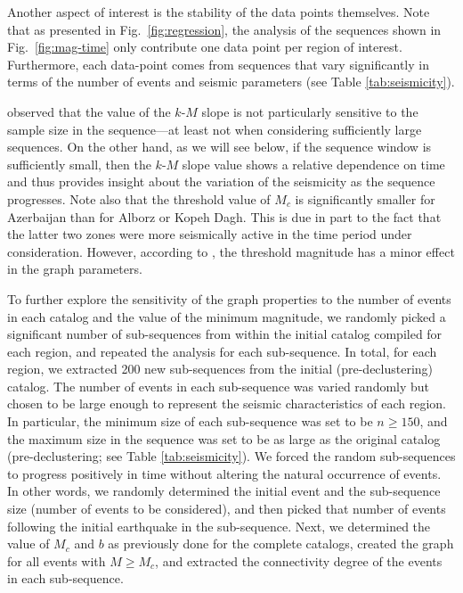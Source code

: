 Another aspect of interest is the stability of the data points themselves. Note that as presented in Fig.~\ref{fig:regression}, the analysis of the sequences shown in Fig.~\ref{fig:mag-time} only contribute one data point per region of interest. Furthermore, each data-point comes from sequences that vary significantly in terms of the number of events and seismic parameters (see Table \ref{tab:seismicity}). 

\citet{Telesca2013} observed that the value of the $k$-$M$ slope is not particularly sensitive to the sample size in the sequence---at least not when considering sufficiently large sequences. On the other hand, as we will see below, if the sequence window is sufficiently small, then the $k$-$M$ slope value shows a relative dependence on time and thus provides insight about the variation of the seismicity as the sequence progresses. Note also that the threshold value of $M_c$ is significantly smaller for Azerbaijan than for Alborz or Kopeh Dagh. This is due in part to the fact that the latter two zones were more seismically active in the time period under consideration. However, according to \citet{Telesca2012}, the threshold magnitude has a minor effect in the graph parameters.

To further explore the sensitivity of the graph properties to the number of events in each catalog and the value of the minimum magnitude, we randomly picked a significant number of sub-sequences from within the initial catalog compiled for each region, and repeated the analysis for each sub-sequence. In total, for each region, we extracted 200 new sub-sequences from the initial (pre-declustering) catalog. The number of events in each sub-sequence was varied randomly but chosen to be large enough to represent the seismic characteristics of each region. In particular, the minimum size of each sub-sequence was set to be $n \geq 150$, and the maximum size in the sequence was set to be as large as the original catalog (pre-declustering; see Table \ref{tab:seismicity}). We forced the random sub-sequences to progress positively in time without altering the natural occurrence of events. In other words, we randomly determined the initial event and the sub-sequence size (number of events to be considered), and then picked that number of events following the initial earthquake in the sub-sequence. Next, we determined the value of $M_c$ and $b$ as previously done for the complete catalogs, created the graph for all events with $M \geq M_c$, and extracted the connectivity degree of the events in each sub-sequence. 

